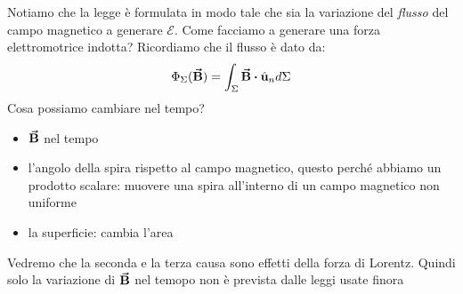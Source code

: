Notiamo che la legge è formulata in modo tale che sia la variazione del \textit{flusso} del campo magnetico a generare $\mathcal{E}$. Come facciamo a generare una forza elettromotrice indotta? Ricordiamo che il flusso è dato da:
\begin{equation*}
	\Phi_\Sigma(\vba B)=\int_\Sigma \vba B\vdot \vbh{u}_n d\Sigma	
\end{equation*}
Cosa possiamo cambiare nel tempo? 
\begin{itemize}
	\item $\vb*{\va{B}}$ nel tempo
	\item l'angolo della spira rispetto al campo magnetico, questo perché abbiamo un prodotto scalare: muovere una spira all'interno di un campo magnetico non uniforme
	\item la superficie: cambia l'area
\end{itemize}


Vedremo che la seconda e la terza causa sono effetti della forza di Lorentz. Quindi solo la variazione di $\vb*{\va{B}}$ nel temopo  non è prevista dalle leggi usate finora








